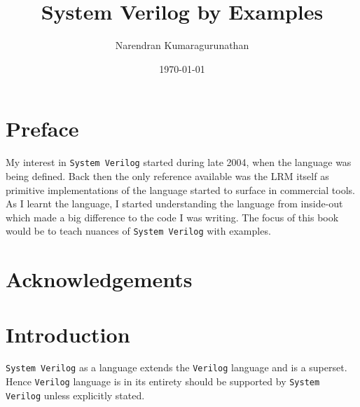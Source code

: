 \documentclass[11pt]{book}              %
\title{\bf System Verilog by Examples}    %
\author{Narendran Kumaragurunathan}              %
\date{\today}                           %
\begin{document}



\frontmatter                            %
\maketitle                              %
\tableofcontents                        %

\chapter{Preface}
My interest in \texttt{System Verilog} started during late 2004, when
the language was being defined. Back then the only reference available
was the LRM itself as primitive implementations of the language
started to surface in commercial tools. As I learnt the language, I
started understanding the language from inside-out which made a big
difference to the code I was writing. The focus of this book would be
to teach nuances of \texttt{System Verilog} with examples.

\chapter{Acknowledgements}

\chapter{Introduction}                %
\texttt{System Verilog} as a language extends the \texttt{Verilog}
language and is a superset. Hence \texttt{Verilog} language is in its
entirety should be supported by \texttt{System Verilog} unless
explicitly stated.

\mainmatter                             %



\end{document}
